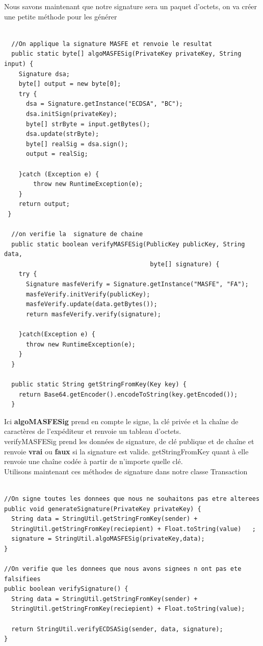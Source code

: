 \documentclass[12pt]{report}
\begin{document}
\hspace{1cm} Nous savons maintenant que notre signature sera un paquet d’octets, on va créer une petite  méthode pour les générer

\begin{lstlisting}

  //On applique la signature MASFE et renvoie le resultat
  public static byte[] algoMASFESig(PrivateKey privateKey, String input) {
    Signature dsa;
    byte[] output = new byte[0];
    try {
      dsa = Signature.getInstance("ECDSA", "BC");
      dsa.initSign(privateKey);
      byte[] strByte = input.getBytes();
      dsa.update(strByte);
      byte[] realSig = dsa.sign();
      output = realSig;
		
    }catch (Exception e) {
        throw new RuntimeException(e);
    }
    return output;
 }
	
  //on verifie la  signature de chaine
  public static boolean verifyMASFESig(PublicKey publicKey, String data, 
                                        byte[] signature) {
    try {
      Signature masfeVerify = Signature.getInstance("MASFE", "FA");
      masfeVerify.initVerify(publicKey);
      masfeVerify.update(data.getBytes());
      return masfeVerify.verify(signature);
    
    }catch(Exception e) {
      throw new RuntimeException(e);
    }
  }

  public static String getStringFromKey(Key key) {
    return Base64.getEncoder().encodeToString(key.getEncoded());
  }
\end{lstlisting}

\hspace{1cm}Ici \textbf{algoMASFESig} prend en compte le signe, la clé privée et la chaîne de caractères de l'expéditeur  et renvoie un tableau d'octets. \\ 
verifyMASFESig prend les données de signature, de clé publique et de chaîne et renvoie \textbf{vrai} ou \textbf{faux} si la signature est valide. getStringFromKey quant à elle renvoie une chaîne codée à partir de n'importe quelle clé.\\
Utilisons maintenant ces méthodes de signature dans notre classe Transaction 

\begin{lstlisting}

//On signe toutes les donnees que nous ne souhaitons pas etre alterees
public void generateSignature(PrivateKey privateKey) {
  String data = StringUtil.getStringFromKey(sender) +
  StringUtil.getStringFromKey(reciepient) + Float.toString(value)	;
  signature = StringUtil.algoMASFESig(privateKey,data);		
}

//On verifie que les donnees que nous avons signees n ont pas ete falsifiees
public boolean verifySignature() {
  String data = StringUtil.getStringFromKey(sender) +
  StringUtil.getStringFromKey(reciepient) + Float.toString(value);
  
  return StringUtil.verifyECDSASig(sender, data, signature);
}

\end{lstlisting}
\end{document}
